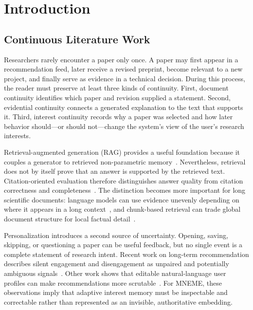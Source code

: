 ﻿%

\chapter{Introduction}

\section{Continuous Literature Work}

Researchers rarely encounter a paper only once.
A paper may first appear in a recommendation feed, later receive a revised preprint, become relevant to a new project, and finally serve as evidence in a technical decision.
During this process, the reader must preserve at least three kinds of continuity.
First, document continuity identifies which paper and revision supplied a statement.
Second, evidential continuity connects a generated explanation to the text that supports it.
Third, interest continuity records why a paper was selected and how later behavior should---or should not---change the system's view of the user's research interests.

Retrieval-augmented generation (RAG) provides a useful foundation because it couples a generator to retrieved non-parametric memory~\cite{lewis2020rag}.
Nevertheless, retrieval does not by itself prove that an answer is supported by the retrieved text.
Citation-oriented evaluation therefore distinguishes answer quality from citation correctness and completeness~\cite{gao2023alce}.
The distinction becomes more important for long scientific documents: language models can use evidence unevenly depending on where it appears in a long context~\cite{liu2024lost}, and chunk-based retrieval can trade global document structure for local factual detail~\cite{zhao2024longrag}.

Personalization introduces a second source of uncertainty.
Opening, saving, skipping, or questioning a paper can be useful feedback, but no single event is a complete statement of research intent.
Recent work on long-term recommendation describes silent engagement and disengagement as unpaired and potentially ambiguous signals~\cite{zhang2025unpaired}.
Other work shows that editable natural-language user profiles can make recommendations more scrutable~\cite{ramos2024scrutable}.
For MNEME, these observations imply that adaptive interest memory must be inspectable and correctable rather than represented as an invisible, authoritative embedding.

